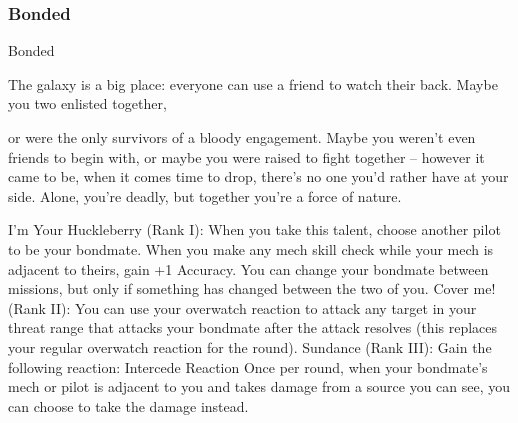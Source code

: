 \subsubsection{Bonded}


                                                     Bonded

The galaxy is a big place: everyone can use a friend to watch their back. Maybe you two enlisted together,

or were the only survivors of a bloody engagement. Maybe you weren’t even friends to begin with, or
maybe you were raised to fight together  -- however it came to be, when it comes time to drop, there’s no
one you’d rather have at your side. Alone, you’re deadly, but together you’re a force of nature.

I’m Your Huckleberry (Rank I): When you take this talent, choose another pilot to be your
bondmate. When you make any mech skill check while your mech is adjacent to theirs, gain +1
Accuracy. You can change your bondmate between missions, but only if something has changed
between the two of you.
Cover me! (Rank II): You can use your overwatch reaction to attack any target in your threat
range that attacks your bondmate after the attack resolves (this replaces your regular overwatch
reaction for the round).
Sundance (Rank III): Gain the following reaction:
         Intercede
         Reaction
         Once per round, when your bondmate’s mech or pilot is adjacent to you and takes
         damage from a source you can see, you can choose to take the damage instead.